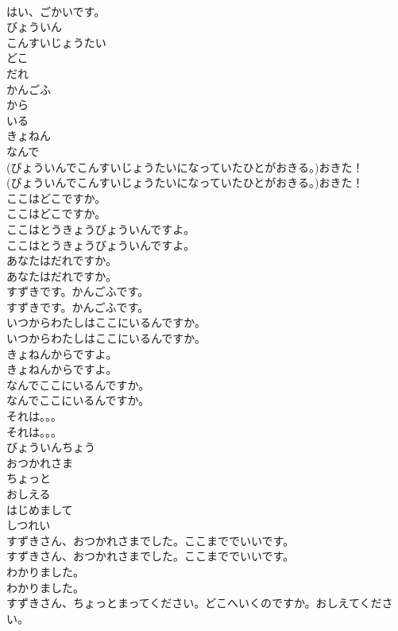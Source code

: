 \documentclass[8pt]{extreport}
\begin{document}
\begin{CJK}{UTF8}{min}
\\	はい、ごかいです。 
\\	びょういん
\\	こんすいじょうたい
\\	どこ
\\	だれ
\\	かんごふ
\\	から
\\	いる
\\	きょねん
\\	なんで
\\	(びょういんでこんすいじょうたいになっていたひとがおきる。)おきた！	
\\	(びょういんでこんすいじょうたいになっていたひとがおきる。)おきた！ 
\\	ここはどこですか。	
\\	ここはどこですか。 
\\	ここはとうきょうびょういんですよ。	
\\	ここはとうきょうびょういんですよ。 
\\	あなたはだれですか。	
\\	あなたはだれですか。 
\\	すずきです。かんごふです。	
\\	すずきです。かんごふです。 
\\	いつからわたしはここにいるんですか。	
\\	いつからわたしはここにいるんですか。 
\\	きょねんからですよ。	
\\	きょねんからですよ。 
\\	なんでここにいるんですか。	
\\	なんでここにいるんですか。 
\\	それは。。。	
\\	それは。。。 
\\	びょういんちょう
\\	おつかれさま
\\	ちょっと
\\	おしえる
\\	はじめまして
\\	しつれい
\\	すずきさん、おつかれさまでした。ここまででいいです。	
\\	すずきさん、おつかれさまでした。ここまででいいです。 
\\	わかりました。	
\\	わかりました。 
\\	すずきさん、ちょっとまってください。どこへいくのですか。おしえてください。	

\end{CJK}
\end{document}
